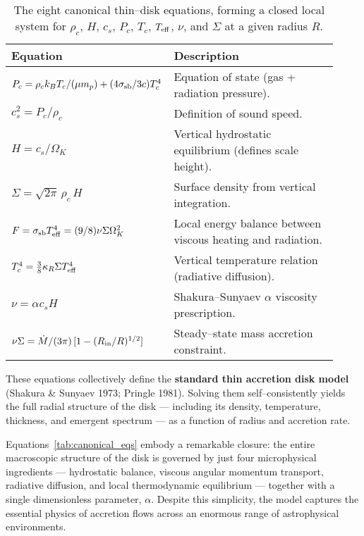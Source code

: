 \begin{table}[ht!]
\centering
\renewcommand{\arraystretch}{1.4}
\begin{tabular}{p{0.40\linewidth} p{0.52\linewidth}}
\toprule
\textbf{Equation} & \textbf{Description} \\
\midrule
$P_c = \rho_c k_B T_c / (\mu m_p) + (4\sigma_{\rm sb}/3c)T_c^4$ 
& Equation of state (gas + radiation pressure). \\[4pt]
$c_s^2 = P_c / \rho_c$ 
& Definition of sound speed. \\[4pt]
$H = c_s / \Omega_K$ 
& Vertical hydrostatic equilibrium (defines scale height). \\[4pt]
$\Sigma = \sqrt{2\pi}\,\rho_c\,H$ 
& Surface density from vertical integration. \\[4pt]
$F = \sigma_{\rm sb} T_{\rm eff}^4 = (9/8)\nu\Sigma\Omega_K^2$ 
& Local energy balance between viscous heating and radiation. \\[4pt]
$T_c^4 = \frac{3}{8}\kappa_R \Sigma T_{\rm eff}^4$ 
& Vertical temperature relation (radiative diffusion). \\[4pt]
$\nu = \alpha c_s H$ 
& Shakura–Sunyaev $\alpha$ viscosity prescription. \\[4pt]
$\nu\Sigma = \dot{M}/(3\pi)\,[1 - (R_{\rm in}/R)^{1/2}]$ 
& Steady–state mass accretion constraint. \\[4pt]
\bottomrule
\end{tabular}
\caption{The eight canonical thin–disk equations, forming a closed local system for $\rho_c$, $H$, $c_s$, $P_c$, $T_c$, $T_{\rm eff}$, $\nu$, and $\Sigma$ at a given radius $R$.}
\label{tab:canonical_eqs}
\end{table}

\noindent
These equations collectively define the \textbf{standard thin accretion disk model} (Shakura \& Sunyaev 1973; Pringle 1981).  
Solving them self–consistently yields the full radial structure of the disk — including its density, temperature, thickness, and emergent spectrum — as a function of radius and accretion rate.

\begin{remark}
Equations~\eqref{tab:canonical_eqs} embody a remarkable closure:
the entire macroscopic structure of the disk is governed by just four microphysical ingredients — 
hydrostatic balance, viscous angular momentum transport, radiative diffusion, and local thermodynamic equilibrium — together with a single dimensionless parameter, $\alpha$.  
Despite this simplicity, the model captures the essential physics of accretion flows across an enormous range of astrophysical environments.
\end{remark}
